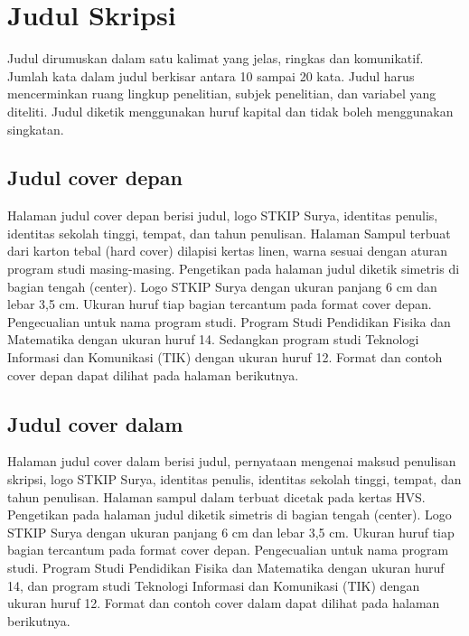 \chapter{Judul Skripsi}
 
Judul dirumuskan dalam satu kalimat yang jelas, ringkas dan komunikatif. Jumlah kata dalam
judul berkisar antara 10 sampai 20 kata. Judul harus mencerminkan ruang lingkup penelitian,
subjek penelitian, dan variabel yang diteliti. Judul diketik menggunakan huruf kapital dan tidak
boleh menggunakan singkatan.

\section{Judul cover depan}
Halaman judul cover depan berisi judul, logo STKIP Surya, identitas penulis, identitas
sekolah tinggi, tempat, dan tahun penulisan. Halaman Sampul terbuat dari karton tebal (hard
cover) dilapisi kertas linen, warna sesuai dengan aturan program studi masing-masing.
Pengetikan pada halaman judul diketik simetris di bagian tengah (center). Logo STKIP
Surya dengan ukuran panjang 6 cm dan lebar 3,5 cm. Ukuran huruf tiap bagian tercantum
pada format cover depan. Pengecualian untuk nama program studi. Program Studi
Pendidikan Fisika dan Matematika dengan ukuran huruf 14. Sedangkan program studi
Teknologi Informasi dan Komunikasi (TIK) dengan ukuran huruf 12. Format dan contoh
cover depan dapat dilihat pada halaman berikutnya.
\newpage
\halamanJudulLuar
\newpage
%
\section{Judul cover dalam}
Halaman judul cover dalam berisi judul, pernyataan mengenai maksud penulisan skripsi,
logo STKIP Surya, identitas penulis, identitas sekolah tinggi, tempat, dan tahun penulisan.
Halaman sampul dalam terbuat dicetak pada kertas HVS. Pengetikan pada halaman judul
diketik simetris di bagian tengah (center). Logo STKIP Surya dengan ukuran panjang 6 cm
dan lebar 3,5 cm. Ukuran huruf tiap bagian tercantum pada format cover depan.
Pengecualian untuk nama program studi. Program Studi Pendidikan Fisika dan Matematika
dengan ukuran huruf 14, dan program studi Teknologi Informasi dan Komunikasi (TIK)
dengan ukuran huruf 12. Format dan contoh cover dalam dapat dilihat pada halaman
berikutnya.
%
\halamanJudul
\newpage
%

